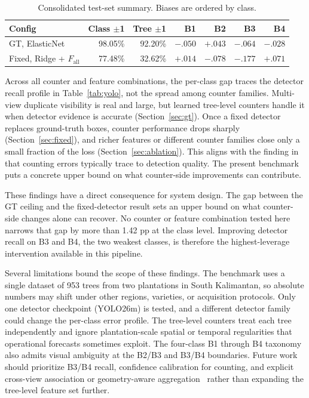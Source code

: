 ﻿\documentclass[conference]{IEEEtran}
\begin{document}
\begin{table}[!htbp]
  \centering
  \scriptsize
  \setlength{\tabcolsep}{2.4pt}
  \caption{Consolidated test-set summary. Biases are ordered by class.}
  \label{tab:summary}
  \begin{tabular}{@{}>{\raggedright\arraybackslash}p{}rrrrrr@{}}
    \toprule
    Config & Class $\pm$1 & Tree $\pm$1 & B1 & B2 & B3 & B4 \\
    \midrule
    GT, ElasticNet &
      98.05\% & 92.20\% & $-.050$ & $+.043$ & $-.064$ & $-.028$ \\
    Fixed, Ridge + $F_{\text{all}}$ &
      77.48\% & 32.62\% & $+.014$ & $-.078$ & $-.177$ & $+.071$ \\
    \bottomrule
  \end{tabular}
\end{table}

Across all counter and feature combinations, the per-class gap traces the
detector recall profile in Table~\ref{tab:yolo}, not the spread among counter
families. Multi-view duplicate visibility is real and large, but learned
tree-level counters handle it when detector evidence is accurate
(Section~\ref{sec:gt}). Once a fixed detector replaces ground-truth boxes,
counter performance drops sharply (Section~\ref{sec:fixed}), and richer
features or different counter families close only a small fraction of the loss
(Section~\ref{sec:ablation}). This aligns with the finding in~\cite{ref7} that
counting errors typically trace to detection quality. The present benchmark puts
a concrete upper bound on what counter-side improvements can contribute.

These findings have a direct consequence for system design. The gap between the
GT ceiling and the fixed-detector result sets an upper bound on what counter-side
changes alone can recover. No counter or feature combination tested here narrows
that gap by more than 1.42 pp at the class level. Improving detector recall on
B3 and B4, the two weakest classes, is therefore the highest-leverage
intervention available in this pipeline.

Several limitations bound the scope of these findings. The benchmark uses a
single dataset of 953 trees from two plantations in South Kalimantan, so
absolute numbers may shift under other regions, varieties, or acquisition
protocols. Only one detector checkpoint (YOLO26m) is tested, and a different
detector family could change the per-class error profile. The tree-level
counters treat each tree independently and ignore plantation-scale spatial or
temporal regularities that operational forecasts sometimes exploit. The
four-class B1 through B4 taxonomy also admits visual ambiguity at the B2/B3 and
B3/B4 boundaries. Future work should prioritize B3/B4 recall, confidence
calibration for counting, and explicit cross-view association or geometry-aware
aggregation~\cite{ref2,ref3,ref4} rather than expanding the tree-level feature
set further.
\end{document}
